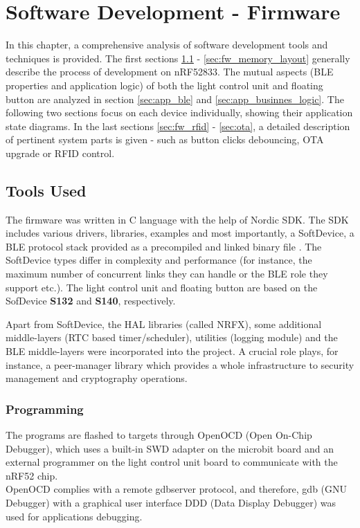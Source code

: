 
\chapter{Software Development - Firmware}
    In this chapter, a comprehensive analysis of software development tools and techniques is provided. The first sections \ref{sec:fw_tools_used} - \ref{sec:fw_memory_layout} generally describe the process of development on nRF52833. The mutual aspects (BLE properties and application logic) of both the light control unit and floating button are analyzed in section \ref{sec:app_ble} and \ref{sec:app_businnes_logic}. The following two sections focus on each device individually, showing their application state diagrams. In the last sections \ref{sec:fw_rfid} - \ref{sec:ota}, a detailed description of pertinent system parts is given - such as button clicks debouncing, OTA upgrade or RFID control.
    
    
    
\section{Tools Used}
    \label{sec:fw_tools_used}
    The firmware was written in C language with the help of Nordic SDK.
    The SDK includes various drivers, libraries, examples and most importantly, a SoftDevice, a BLE protocol stack provided as a precompiled and linked binary file \cite{nrf52doc:softdevice}. The SoftDevice types differ in complexity and performance (for instance, the maximum number of concurrent links they can handle or the BLE role they support etc.). The light control unit and floating button are based on the SofDevice \textbf{S132} and \textbf{S140}, respectively. 
    
    Apart from SoftDevice, the HAL libraries (called NRFX), some additional middle-layers (RTC based timer/scheduler), utilities (logging module) and the BLE middle-layers were incorporated into the project. A crucial role plays, for instance, a peer-manager library which provides a whole infrastructure to security management and cryptography operations.
    
    \subsection{Programming}
        The programs are flashed to targets through OpenOCD (Open On-Chip Debugger), which uses a built-in SWD adapter on the microbit board and an external programmer on the light control unit board to communicate with the nRF52 chip.\\
        OpenOCD complies with a remote gdbserver protocol, and therefore, gdb (GNU Debugger) with a graphical user interface DDD (Data Display Debugger) was used for applications debugging.
        
